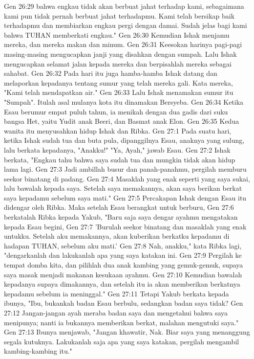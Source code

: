 Gen 26:29  bahwa engkau tidak akan berbuat jahat terhadap kami, sebagaimana kami pun tidak pernah berbuat jahat terhadapmu. Kami telah bersikap baik terhadapmu dan membiarkan engkau pergi dengan damai. Sudah jelas bagi kami bahwa TUHAN memberkati engkau."
Gen 26:30  Kemudian Ishak menjamu mereka, dan mereka makan dan minum.
Gen 26:31  Keesokan harinya pagi-pagi masing-masing mengucapkan janji yang disahkan dengan sumpah. Lalu Ishak mengucapkan selamat jalan kepada mereka dan berpisahlah mereka sebagai sahabat.
Gen 26:32  Pada hari itu juga hamba-hamba Ishak datang dan melaporkan kepadanya tentang sumur yang telah mereka gali. Kata mereka, "Kami telah mendapatkan air."
Gen 26:33  Lalu Ishak menamakan sumur itu "Sumpah". Itulah asal mulanya kota itu dinamakan Bersyeba.
Gen 26:34  Ketika Esau berumur empat puluh tahun, ia menikah dengan dua gadis dari suku bangsa Het, yaitu Yudit anak Beeri, dan Basmat anak Elon.
Gen 26:35  Kedua wanita itu menyusahkan hidup Ishak dan Ribka.
Gen 27:1  Pada suatu hari, ketika Ishak sudah tua dan buta pula, dipanggilnya Esau, anaknya yang sulung, lalu berkata kepadanya, "Anakku!" "Ya, Ayah," jawab Esau.
Gen 27:2  Ishak berkata, "Engkau tahu bahwa saya sudah tua dan mungkin tidak akan hidup lama lagi.
Gen 27:3  Jadi ambillah busur dan panah-panahmu, pergilah memburu seekor binatang di padang.
Gen 27:4  Masaklah yang enak seperti yang saya sukai, lalu bawalah kepada saya. Setelah saya memakannya, akan saya berikan berkat saya kepadamu sebelum saya mati."
Gen 27:5  Percakapan Ishak dengan Esau itu didengar oleh Ribka. Maka setelah Esau berangkat untuk berburu,
Gen 27:6  berkatalah Ribka kepada Yakub, "Baru saja saya dengar ayahmu mengatakan kepada Esau begini,
Gen 27:7  'Burulah seekor binatang dan masaklah yang enak untukku. Setelah aku memakannya, akan kuberikan berkatku kepadamu di hadapan TUHAN, sebelum aku mati.'
Gen 27:8  Nah, anakku," kata Ribka lagi, "dengarkanlah dan lakukanlah apa yang saya katakan ini.
Gen 27:9  Pergilah ke tempat domba kita, dan pilihlah dua anak kambing yang gemuk-gemuk, supaya saya masak menjadi makanan kesukaan ayahmu.
Gen 27:10  Kemudian bawalah kepadanya supaya dimakannya, dan setelah itu ia akan memberikan berkatnya kepadamu sebelum ia meninggal."
Gen 27:11  Tetapi Yakub berkata kepada ibunya, "Ibu, bukankah badan Esau berbulu, sedangkan badan saya tidak?
Gen 27:12  Jangan-jangan ayah meraba badan saya dan mengetahui bahwa saya menipunya; nanti ia bukannya memberikan berkat, malahan mengutuki saya."
Gen 27:13  Ibunya menjawab, "Jangan khawatir, Nak. Biar saya yang menanggung segala kutuknya. Lakukanlah saja apa yang saya katakan, pergilah mengambil kambing-kambing itu."
